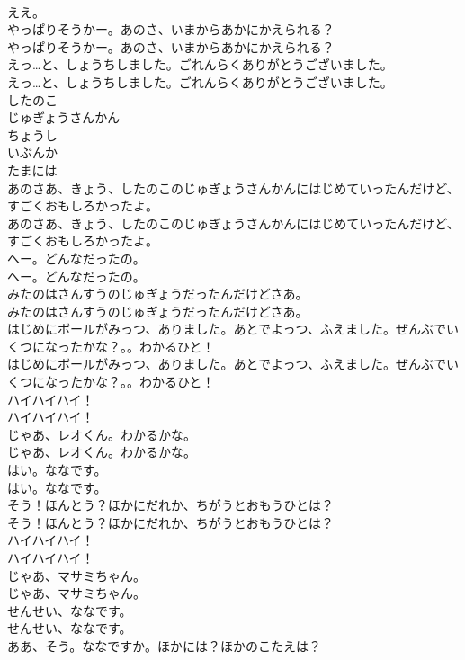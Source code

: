 \documentclass[8pt]{extreport}
\begin{document}
\begin{CJK}{UTF8}{min}
\\	ええ。 
\\	やっぱりそうかー。あのさ、いまからあかにかえられる？	
\\	やっぱりそうかー。あのさ、いまからあかにかえられる？ 
\\	えっ…と、しょうちしました。ごれんらくありがとうございました。	
\\	えっ…と、しょうちしました。ごれんらくありがとうございました。 
\\	したのこ
\\	じゅぎょうさんかん
\\	ちょうし
\\	いぶんか
\\	たまには
\\	あのさあ、きょう、したのこのじゅぎょうさんかんにはじめていったんだけど、すごくおもしろかったよ。	
\\	あのさあ、きょう、したのこのじゅぎょうさんかんにはじめていったんだけど、すごくおもしろかったよ。 
\\	へー。どんなだったの。	
\\	へー。どんなだったの。 
\\	みたのはさんすうのじゅぎょうだったんだけどさあ。	
\\	みたのはさんすうのじゅぎょうだったんだけどさあ。 
\\	はじめにボールがみっつ、ありました。あとでよっつ、ふえました。ぜんぶでいくつになったかな？。。わかるひと！	
\\	はじめにボールがみっつ、ありました。あとでよっつ、ふえました。ぜんぶでいくつになったかな？。。わかるひと！ 
\\	ハイハイハイ！	
\\	ハイハイハイ！ 
\\	じゃあ、レオくん。わかるかな。	
\\	じゃあ、レオくん。わかるかな。 
\\	はい。ななです。	
\\	はい。ななです。 
\\	そう！ほんとう？ほかにだれか、ちがうとおもうひとは？	
\\	そう！ほんとう？ほかにだれか、ちがうとおもうひとは？ 
\\	ハイハイハイ！	
\\	ハイハイハイ！ 
\\	じゃあ、マサミちゃん。	
\\	じゃあ、マサミちゃん。 
\\	せんせい、ななです。	
\\	せんせい、ななです。 
\\	ああ、そう。ななですか。ほかには？ほかのこたえは？	

\end{CJK}
\end{document}

